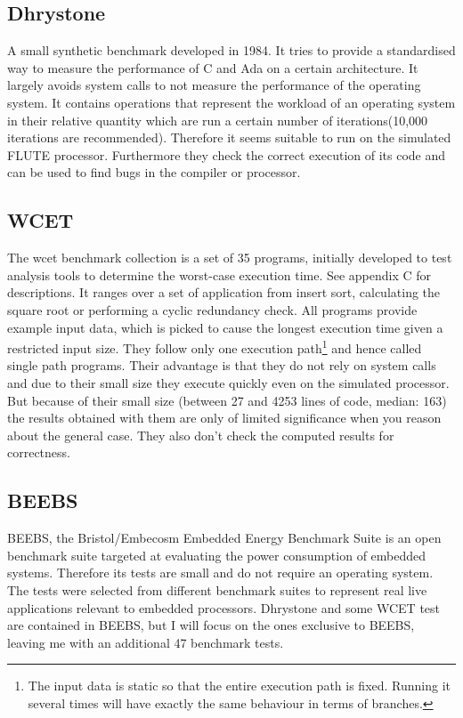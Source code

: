 \documentclass[12pt,twoside,notitlepage]{report}
\begin{document}
\subsection{Dhrystone}
A small synthetic benchmark developed in 1984. It tries to provide a standardised way to measure the performance of C and Ada on a certain architecture. It largely avoids system calls to not measure the performance of the operating system. It contains operations that represent the workload of an operating system in their relative quantity which are run a certain number of iterations(10,000 iterations are recommended)\cite{weicker1984dhrystone}. Therefore it seems suitable to run on the simulated FLUTE processor. Furthermore they check the correct execution of its code and can be used to find bugs in the compiler or processor.

\subsection{WCET}
The wcet benchmark collection is a set of 35 programs, initially developed to test analysis tools to determine the worst-case execution time. See appendix C for descriptions. It ranges over a set of application from insert sort, calculating the square root or performing a cyclic redundancy check. All programs provide example input data, which is picked to cause the longest execution time given a restricted input size. They follow only one execution path\footnote{The input data is static so that the entire execution path is fixed. Running it several times will have exactly the same behaviour in terms of branches.} and hence called single path programs.\cite{Gustafsson:WCET2010:Benchmarks} Their advantage is that they do not rely on system calls and due to their small size they execute quickly even on the simulated processor. But because of their small size (between 27 and 4253 lines of code, median: 163) the results obtained with them are only of limited significance when you reason about the general case. They also don't check the computed results for correctness.


\subsection{BEEBS}

BEEBS, the Bristol/Embecosm Embedded Energy Benchmark Suite is an open benchmark suite targeted at evaluating the power consumption of embedded systems. Therefore its tests are small and do not require an operating system. The tests were selected from different benchmark suites to represent real live applications relevant to embedded processors\cite{pallister2013beebs}.
Dhrystone and some WCET test are contained in BEEBS, but I will focus on the ones exclusive to BEEBS, leaving me with an additional 47 benchmark tests. 
\end{document}

